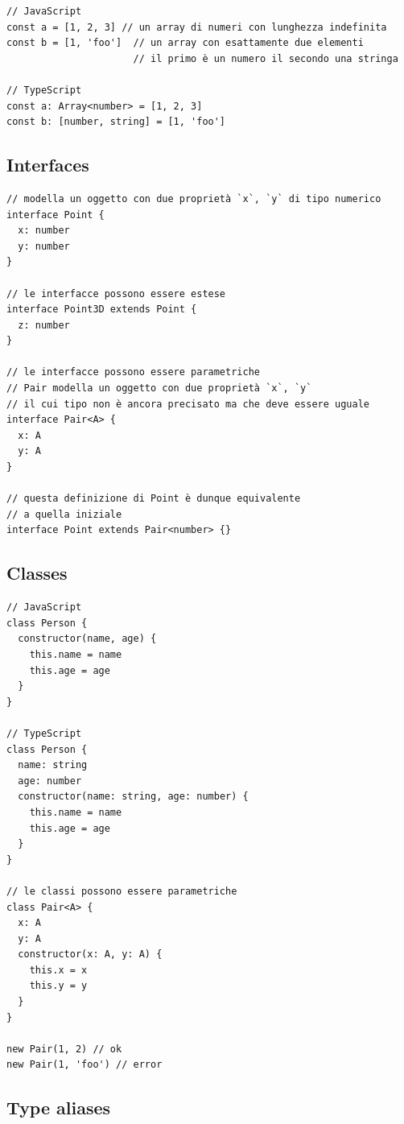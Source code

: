 \documentclass[12pt]{article}
\begin{document}
\begin{verbatim}
// JavaScript
const a = [1, 2, 3] // un array di numeri con lunghezza indefinita
const b = [1, 'foo']  // un array con esattamente due elementi
                      // il primo è un numero il secondo una stringa

// TypeScript
const a: Array<number> = [1, 2, 3]
const b: [number, string] = [1, 'foo']
\end{verbatim}

\subsection{Interfaces}

\begin{verbatim}
// modella un oggetto con due proprietà `x`, `y` di tipo numerico
interface Point {
  x: number
  y: number
}

// le interfacce possono essere estese
interface Point3D extends Point {
  z: number
}

// le interfacce possono essere parametriche
// Pair modella un oggetto con due proprietà `x`, `y`
// il cui tipo non è ancora precisato ma che deve essere uguale
interface Pair<A> {
  x: A
  y: A
}

// questa definizione di Point è dunque equivalente
// a quella iniziale
interface Point extends Pair<number> {}
\end{verbatim}

\subsection{Classes}

\begin{verbatim}
// JavaScript
class Person {
  constructor(name, age) {
    this.name = name
    this.age = age
  }
}

// TypeScript
class Person {
  name: string
  age: number
  constructor(name: string, age: number) {
    this.name = name
    this.age = age
  }
}

// le classi possono essere parametriche
class Pair<A> {
  x: A
  y: A
  constructor(x: A, y: A) {
    this.x = x
    this.y = y
  }
}

new Pair(1, 2) // ok
new Pair(1, 'foo') // error
\end{verbatim}

\subsection{Type aliases}
\end{document}
